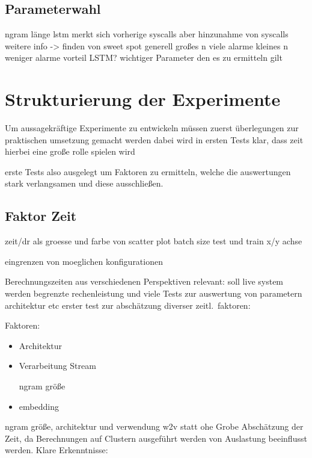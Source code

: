         \subsection{Parameterwahl}
            ngram länge
            lstm merkt sich vorherige syscalls aber hinzunahme von syscalls weitere info
            -> finden von sweet spot
            generell großes n viele alarme
            kleines n weniger alarme  vorteil \ac{LSTM}\@?
            wichtiger Parameter den es zu ermitteln gilt

    \section{Strukturierung der Experimente}\label{sec:StrukExp}
        Um aussagekräftige Experimente zu entwickeln müssen zuerst 
        überlegungen zur praktischen umsetzung gemacht werden
        dabei wird in ersten Tests klar, dass zeit hierbei eine große rolle spielen wird

        erste Tests also ausgelegt um Faktoren zu ermitteln, welche die auswertungen stark verlangsamen
        und diese ausschließen.

        \subsection{Faktor Zeit}

            zeit/dr als groesse und farbe von scatter plot
            batch size test und train x/y achse

            eingrenzen von moeglichen konfigurationen

            Berechnungszeiten aus verschiedenen Perspektiven relevant:
            soll live system werden
            begrenzte rechenleistung und viele Tests zur auswertung von parametern architektur etc
            erster test zur abschätzung diverser zeitl.\ faktoren:

            Faktoren:
            \begin{itemize}
                \item Architektur
                \item Verarbeitung Stream

                     ngram größe
                \item embedding
            \end{itemize}
        ngram größe, architektur und verwendung w2v statt ohe
        Grobe Abschätzung der Zeit, da Berechnungen auf Clustern ausgeführt werden von Auslastung beeinflusst werden.
        Klare Erkenntnisse:

